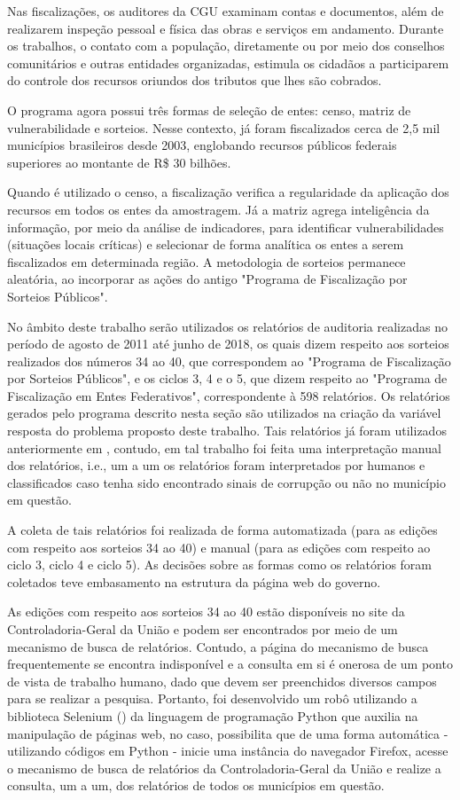 Nas fiscalizações, os auditores da CGU examinam contas e documentos, além de realizarem inspeção pessoal e física das obras e serviços em andamento. Durante os trabalhos, o contato com a população, diretamente ou por meio dos conselhos comunitários e outras entidades organizadas, estimula os cidadãos a participarem do controle dos recursos oriundos dos tributos que lhes são cobrados.

O programa agora possui três formas de seleção de entes: censo, matriz de vulnerabilidade e sorteios. Nesse contexto, já foram fiscalizados cerca de 2,5 mil municípios brasileiros desde 2003, englobando recursos públicos federais superiores ao montante de R\$ 30 bilhões.

Quando é utilizado o censo, a fiscalização verifica a regularidade da aplicação dos recursos em todos os entes da amostragem. Já a matriz agrega inteligência da informação, por meio da análise de indicadores, para identificar vulnerabilidades (situações locais críticas) e selecionar de forma analítica os entes a serem fiscalizados em determinada região. A metodologia de sorteios permanece aleatória, ao incorporar as ações do antigo "Programa de Fiscalização por Sorteios Públicos".

No âmbito deste trabalho serão utilizados os relatórios de auditoria realizadas no período de agosto de 2011 até junho de 2018, os quais dizem respeito aos sorteios realizados dos números 34 ao 40, que correspondem ao "Programa de Fiscalização por Sorteios Públicos", e os ciclos 3, 4 e o 5, que dizem respeito ao "Programa de Fiscalização em Entes Federativos", correspondente à 598 relatórios. Os relatórios gerados pelo programa descrito nesta seção são utilizados na criação da variável resposta do problema proposto deste trabalho. Tais relatórios já foram utilizados anteriormente em \citet{FerrazFinan2008}, contudo, em tal trabalho foi feita uma interpretação manual dos relatórios, i.e., um a um os relatórios foram interpretados por humanos e classificados caso tenha sido encontrado sinais de corrupção ou não no município em questão.

A coleta de tais relatórios foi realizada de forma automatizada (para as edições com respeito aos sorteios 34 ao 40) e manual (para as edições com respeito ao ciclo 3, ciclo 4 e ciclo 5). As decisões sobre as formas como os relatórios foram coletados teve embasamento na estrutura da página web do governo.

As edições com respeito aos sorteios 34 ao 40 estão disponíveis no site da Controladoria-Geral da União e podem ser encontrados por meio de um mecanismo de busca de relatórios. Contudo, a página do mecanismo de busca frequentemente se encontra indisponível e a consulta em si é onerosa de um ponto de vista de trabalho humano, dado que devem ser preenchidos diversos campos para se realizar a pesquisa. Portanto, foi desenvolvido um robô utilizando a biblioteca Selenium (\citet{Selenium}) da linguagem de programação Python que auxilia na manipulação de páginas web, no caso, possibilita que de uma forma automática - utilizando códigos em Python - inicie uma instância do navegador Firefox, acesse o mecanismo de busca de relatórios da Controladoria-Geral da União e realize a consulta, um a um, dos relatórios de todos os municípios em questão.

